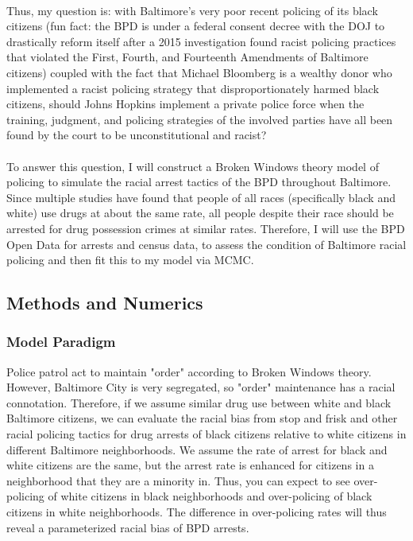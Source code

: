 \documentclass[10pt]{article}
\begin{document}
\\
Thus, my question is: with Baltimore's very poor recent policing of its black citizens (fun fact: the BPD is under a federal consent decree with the DOJ to drastically reform itself after a 2015 investigation found racist policing practices that violated the First, Fourth, and Fourteenth Amendments of Baltimore citizens) coupled with the fact that Michael Bloomberg is a wealthy donor who implemented a racist policing strategy that disproportionately harmed black citizens, should Johns Hopkins implement a private police force when the training, judgment, and policing strategies of the involved parties have all been found by the court to be unconstitutional and racist?\\
\\
To answer this question, I will construct a Broken Windows theory model of policing to simulate the racial arrest tactics of the BPD throughout Baltimore. Since multiple studies have found that people of all races (specifically black and white) use drugs at about the same rate, all people despite their race should be arrested for drug possession crimes at similar rates. Therefore, I will use the BPD Open Data for arrests and census data, to  assess the condition of Baltimore racial policing and then fit this to my model via MCMC.

\subsection*{Methods and Numerics}
\subsubsection{Model Paradigm}
Police patrol act to maintain "order" according to Broken Windows theory. However, Baltimore City is very segregated, so "order" maintenance has a racial connotation. Therefore, if we assume similar drug use between white and black Baltimore citizens, we can evaluate the racial bias from stop and frisk and other racial policing tactics for drug arrests of black citizens relative to white citizens in different Baltimore neighborhoods. We assume the rate of arrest for black and white citizens are the same, but the arrest rate is enhanced for citizens in a neighborhood that they are a minority in. Thus, you can expect to see over-policing of white citizens in black neighborhoods and over-policing of black citizens in white neighborhoods. The difference in over-policing rates will thus reveal a parameterized racial bias of BPD arrests.
\end{document}
